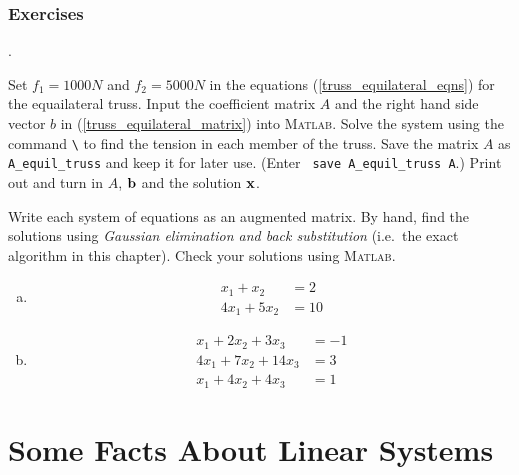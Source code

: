 \subsection*{Exercises}
\nobreak
\begin{list}
{.}{}

\item  Set $f_1 = 1000N$ and $f_2 = 5000N$ in
the equations (\ref{truss_equilateral_eqns}) for the equailateral truss.
Input the coefficient matrix $A$ and the right hand side vector $b$ in
(\ref{truss_equilateral_matrix}) into \textsc{Matlab}.
Solve the system using the command \verb&\& to find the tension in each member of the
truss. Save the matrix $A$ as \verb&A_equil_truss& and keep it for later use.
(Enter \verb& save A_equil_truss A&.)
Print out and turn in $A$, $\mathbf{b}$ and the solution $\mathbf{x}$.
\label{exr:truss}

\item Write each system of equations as an augmented matrix. By hand, find
the solutions using {\em Gaussian elimination and back substitution} (i.e.\ the exact
algorithm in this chapter). Check
your solutions using \textsc{Matlab}.

\begin{enumerate}[(a)]
\item 
\begin{equation*}
\begin{split}
     x_1 +  x_2   & = 2 \\
   4 x_1 + 5 x_2  & = 10
\end{split}
\end{equation*}
\item
\begin{equation*}
\begin{split}
     x_1 + 2 x_2 + 3 x_3 & = -1 \\
   4 x_1 + 7 x_2 + 14 x_3 & = 3 \\
    x_1 +  4 x_2 + 4 x_3 & =  1
\end{split}
\end{equation*}
\end{enumerate}

\end{list}




\chapter{Some Facts About Linear Systems}
\label{sec:lineartheory}



